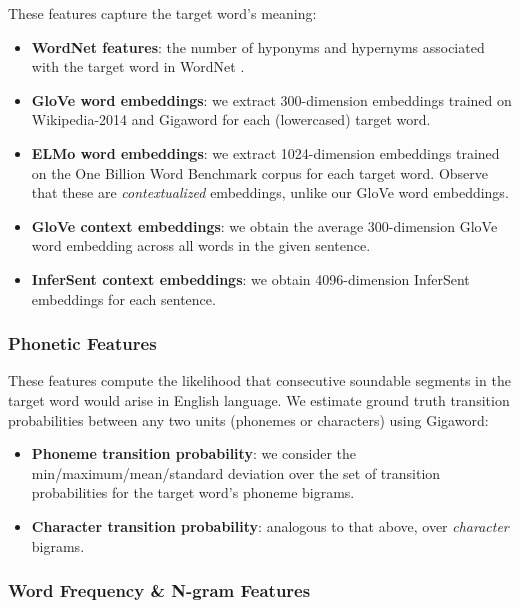 \documentclass{dcthesis}
\theoremstyle{definition}
\theoremstyle{remark}
\begin{document}
\label{paper:semantic_features} These features capture the target word's meaning:

\begin{itemize}
  \item \textbf{WordNet features}: the number of hyponyms and hypernyms associated with the target word in WordNet \citep{Fellbaum:2005}.
  \item \textbf{GloVe word embeddings}: we extract 300-dimension embeddings trained on Wikipedia-2014 and Gigaword \citep{pennington2014glove} for each (lowercased) target word. 
  \item \textbf{ELMo word embeddings}: we extract 1024-dimension embeddings trained on the One Billion Word Benchmark corpus \citep{Peters:2018} for each target word. Observe that these are \textit{contextualized} embeddings, unlike our GloVe word embeddings. 
  \item \textbf{GloVe context embeddings}: we obtain the average 300-dimension GloVe word embedding across all words in the given sentence.
  \item \textbf{InferSent context embeddings}: we obtain 4096-dimension InferSent embeddings \citep{conneau-EtAl:2017:EMNLP2017} for each sentence.
\end{itemize}

\subsubsection{Phonetic Features}

These features compute the likelihood that consecutive soundable segments in the target word would arise in English language. We estimate ground truth transition probabilities between any two units (phonemes or characters) using Gigaword:

\begin{itemize}
  \item \textbf{Phoneme transition probability}: we consider the min/maximum/mean/standard deviation over the set of transition probabilities for the target word's phoneme bigrams. 
  \item \textbf{Character transition probability}: analogous to that above, over \textit{character} bigrams.
\end{itemize}

\subsubsection{Word Frequency \& N-gram Features}
\end{document}
